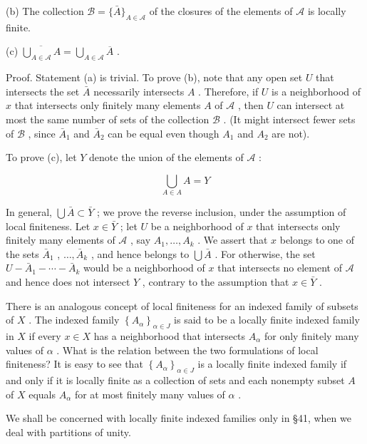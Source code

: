 (b) The collection \(\mathcal{B} = \{ \bar{A}{\} }_{A \in  \mathcal{A}}\) of the closures of the elements of \(\mathcal{A}\) is locally finite.

(c) \(\overline{\mathop{\bigcup }\limits_{{A \in  \mathcal{A}}}A} = \mathop{\bigcup }\limits_{{A \in  \mathcal{A}}}\overline{A}\) .

Proof. Statement (a) is trivial. To prove (b), note that any open set \(U\) that intersects the set \(\bar{A}\) necessarily intersects \(A\) . Therefore, if \(U\) is a neighborhood of \(x\) that intersects only finitely many elements \(A\) of \(\mathcal{A}\) , then \(U\) can intersect at most the same number of sets of the collection \(\mathcal{B}\) . (It might intersect fewer sets of \(\mathcal{B}\) , since \({\bar{A}}_{1}\) and \({\bar{A}}_{2}\) can be equal even though \({A}_{1}\) and \({A}_{2}\) are not).

To prove (c), let \(Y\) denote the union of the elements of \(\mathcal{A}\) :

\[
\mathop{\bigcup }\limits_{{A \in  A}}A = Y
\]

In general, \(\bigcup \bar{A} \subset  \bar{Y}\) ; we prove the reverse inclusion, under the assumption of local finiteness. Let \(x \in  \bar{Y}\) ; let \(U\) be a neighborhood of \(x\) that intersects only finitely many elements of \(\mathcal{A}\) , say \({A}_{1},\ldots ,{A}_{k}\) . We assert that \(x\) belongs to one of the sets \({\bar{A}}_{1}\) , \(\ldots ,{\bar{A}}_{k}\) , and hence belongs to \(\bigcup \bar{A}\) . For otherwise, the set \(U - {\bar{A}}_{1} - \cdots  - {\bar{A}}_{k}\) would be a neighborhood of \(x\) that intersects no element of \(\mathcal{A}\) and hence does not intersect \(Y\) , contrary to the assumption that \(x \in  \bar{Y}\) .

There is an analogous concept of local finiteness for an indexed family of subsets of \(X\) . The indexed family \({\left\{  {A}_{\alpha }\right\}  }_{\alpha  \in  J}\) is said to be a locally finite indexed family in \(X\) if every \(x \in  X\) has a neighborhood that intersects \({A}_{\alpha }\) for only finitely many values of \(\alpha\) . What is the relation between the two formulations of local finiteness? It is easy to see that \({\left\{  {A}_{\alpha }\right\}  }_{\alpha  \in  J}\) is a locally finite indexed family if and only if it is locally finite as a collection of sets and each nonempty subset \(A\) of \(X\) equals \({A}_{\alpha }\) for at most finitely many values of \(\alpha\) .

We shall be concerned with locally finite indexed families only in §41, when we deal with partitions of unity.

